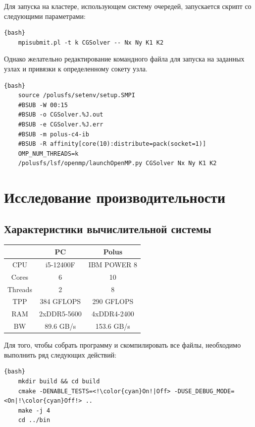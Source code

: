 \documentclass[12pt, a4paper]{article}
\begin{document}
Для запуска на кластере, использующем систему очередей, запускается скрипт со следующими параметрами:

\begin{lstlisting}{bash}
	mpisubmit.pl -t k CGSolver -- Nx Ny K1 K2
\end{lstlisting}

Однако желательно редактирование командного файла для запуска на заданных узлах и привязки к определенному сокету узла.

\begin{lstlisting}{bash}
	source /polusfs/setenv/setup.SMPI
	#BSUB -W 00:15
	#BSUB -o CGSolver.%J.out
	#BSUB -e CGSolver.%J.err
	#BSUB -m polus-c4-ib
	#BSUB -R affinity[core(10):distribute=pack(socket=1)]
	OMP_NUM_THREADS=k
	/polusfs/lsf/openmp/launchOpenMP.py CGSolver Nx Ny K1 K2
\end{lstlisting}


\newpage

\section{Исследование производительности}

\subsection{Характеристики вычислительной системы}

\begin{center}
	\setlength{\tabcolsep}{30pt}
	\renewcommand{\arraystretch}{1.5}
	\begin{tabular}{ c|c|c } 
		 & PC & Polus \\ 
		\hline
		CPU  & i5-12400F & IBM POWER 8 \\ 
		Cores & 6 & 10 \\ 
		Threads & 2 & 8 \\
		TPP & 384 GFLOPS & 290 GFLOPS \\
		RAM & 2xDDR5-5600  & 4xDDR4-2400 \\
		BW & 89.6 GB/s & 153.6 GB/s \\
	\end{tabular}
\end{center}

Для того, чтобы собрать программу и скомпилировать все файлы, необходимо выполнить ряд следующих действий:

\begin{lstlisting}[escapechar=!]{bash}
	mkdir build && cd build
	cmake -DENABLE_TESTS=<!\color{cyan}On!|Off> -DUSE_DEBUG_MODE=<On|!\color{cyan}Off!> ..
	make -j 4
	cd ../bin
\end{lstlisting}
\end{document}

